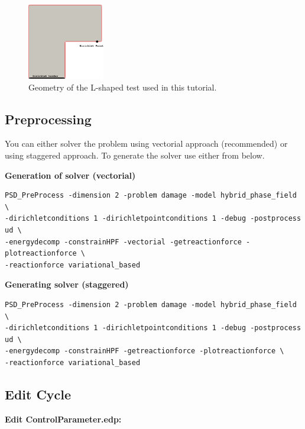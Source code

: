 \newcommand{\psd}[1]{{\small\sffamily{\color{blue!60}#1}}}

\begin{figure}[h!]
\centering
\includegraphics[width=0.3\textwidth]{./Images/fm-geometry.png}
\caption{Geometry of the L-shaped test used in this tutorial. \label{L-shape-geo}}
\end{figure}

\subsection{Preprocessing}

You can either solver the problem using vectorial approach (recommended)
or using staggered approach. To generate the solver use either from
below.

\textbf{Generation of solver (vectorial)}

\begin{lstlisting}[style=BashInputStyle]
PSD_PreProcess -dimension 2 -problem damage -model hybrid_phase_field \
-dirichletconditions 1 -dirichletpointconditions 1 -debug -postprocess ud \
-energydecomp -constrainHPF -vectorial -getreactionforce -plotreactionforce \
-reactionforce variational_based
\end{lstlisting}

\textbf{Generating solver (staggered)}

\begin{lstlisting}[style=BashInputStyle]
PSD_PreProcess -dimension 2 -problem damage -model hybrid_phase_field \
-dirichletconditions 1 -dirichletpointconditions 1 -debug -postprocess ud \
-energydecomp -constrainHPF -getreactionforce -plotreactionforce \
-reactionforce variational_based
\end{lstlisting}

\subsection{Edit Cycle}

\textbf{Edit ControlParameter.edp:}

